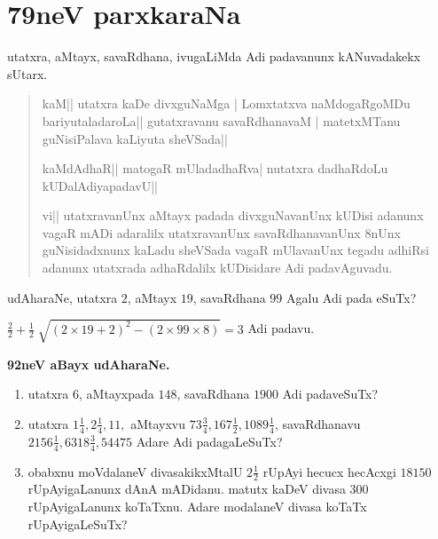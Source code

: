 \chapter{79neV parxkaraNa}

utatxra, aMtayx, savaRdhana, ivugaLiMda Adi padavanunx kANuvadakekx sUtarx.

\begin{verse}
kaM|| utatxra kaDe divxguNaMga | Lomxtatxva naMdogaRgoMDu bariyutaladaroLa|| gutatxravanu savaR\-dhanavaM | matetxMTanu guNisiPalava kaLiyuta sheVSada||

kaMdAdhaR|| matogaR mUladadhaRva| nutatxra dadhaRdoLu kUDalAdiyapadavU||

vi|| utatxravanUnx aMtayx padada divxguNavanUnx kUDisi adanunx vagaR  mADi adaralilx utatxravanUnx savaRdhanavanUnx $8$nUnx guNisidadxnunx kaLadu sheVSada vagaR mUlavanUnx tegadu adhiRsi adanunx utatxrada adhaRdalilx kUDisidare Adi padavAguvadu.
\end{verse}

udAharaNe, utatxra $2$, aMtayx $19$, savaRdhana $99$ Agalu Adi pada eSuTx?

\qq$\tfrac{2}{2}+\tfrac{1}{2}\; \sqrt{(2\times19+2)^{2}-(2\times99\times8)}=3$ Adi padavu.

\begin{center}
{\bf\large 92neV aBayx udAharaNe.}
\end{center}

\begin{enumerate}[\rm(1)]
\item utatxra $6$, aMtayxpada $148$, savaRdhana $1900$ Adi padaveSuTx?

\item utatxra $1\tfrac{1}{4}, 2\tfrac{1}{4}, 11,$ aMtayxvu $73\tfrac{3}{4}, 167\tfrac{1}{2}, 1089\tfrac{1}{4}$, savaRdhanavu $2156\tfrac{1}{4}, 6318\tfrac{3}{4}, 54475$ Adare Adi padagaLeSuTx?

\item obabxnu moVdalaneV divasakikxMtalU $2\tfrac{1}{2}$ rUpAyi hecucx hecAcxgi $18150$ rUpAyigaLanunx dAnA mADidanu. matutx kaDeV divasa $300$ rUpAyigaLanunx koTaTxnu. Adare modalaneV divasa koTaTx rUpAyigaLeSuTx?
 
\end{enumerate}
